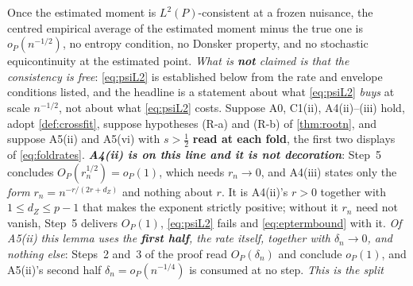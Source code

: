 \begin{lemma}\label{lem:epterm}
Once the estimated moment is $L^{2}(P)$-consistent at a frozen nuisance, the centred empirical average of
the estimated moment minus the true one is $o_P(n^{-1/2})$, no entropy condition, no Donsker property,
and no stochastic equicontinuity at the estimated point. \emph{What is \textbf{not} claimed is that the
consistency is free}: \eqref{eq:psiL2} is established below from the rate and envelope conditions listed,
and the headline is a statement about what \eqref{eq:psiL2} \emph{buys} at scale $n^{-1/2}$, not about what
\eqref{eq:psiL2} costs.
Suppose A0, C1(ii), A4(ii)--(iii) hold, adopt \cref{def:crossfit}, suppose hypotheses (R-a) and (R-b) of
\cref{thm:rootn}, and suppose A5(ii) and A5(vi) with $s>\tfrac12$ \textbf{read at each fold}, the first
two displays of \eqref{eq:foldrates}.
\emph{\textbf{A4\textup{(ii)} is on this line and it is not decoration}}: Step~5 concludes
$O_P(r_n^{1/2})=o_P(1)$, which needs $r_n\to0$, and A4(iii) states only the \emph{form}
$r_n=n^{-r/(2r+d_Z)}$ and nothing about $r$. It is A4(ii)'s $r>0$ together with $1\le d_Z\le p-1$ that
makes the exponent strictly positive; without it $r_n$ need not vanish, Step~5 delivers $O_P(1)$,
\eqref{eq:psiL2} fails and \eqref{eq:eptermbound} with it.
\emph{Of A5(ii) this lemma uses the \textbf{first half}, the rate itself, together with
$\delta_n\to0$, and nothing else}: Steps~2 and~3 of the proof read $O_P(\delta_n)$ and conclude $o_P(1)$,
and A5\textup{(ii)}'s second half $\delta_n=o_P(n^{-1/4})$ is consumed at no step. \emph{This is the split
}
\end{lemma}
